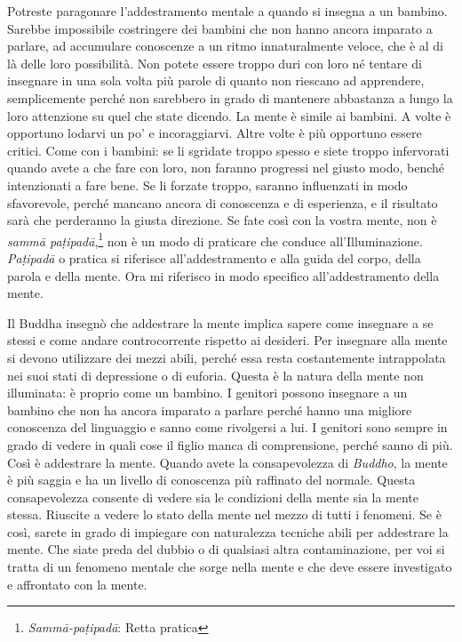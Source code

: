 Potreste paragonare l'addestramento mentale a quando si insegna a un
bambino. Sarebbe impossibile costringere dei bambini che non hanno
ancora imparato a parlare, ad accumulare conoscenze a un ritmo
innaturalmente veloce, che è al di là delle loro possibilità. Non potete
essere troppo duri con loro né tentare di insegnare in una sola volta
più parole di quanto non riescano ad apprendere, semplicemente perché
non sarebbero in grado di mantenere abbastanza a lungo la loro
attenzione su quel che state dicendo. La mente è simile ai bambini. A
volte è opportuno lodarvi un po' e incoraggiarvi. Altre volte è più
opportuno essere critici. Come con i bambini: se li sgridate troppo
spesso e siete troppo infervorati quando avete a che fare con loro, non
faranno progressi nel giusto modo, benché intenzionati a fare bene. Se
li forzate troppo, saranno influenzati in modo sfavorevole, perché
mancano ancora di conoscenza e di esperienza, e il risultato sarà che
perderanno la giusta direzione. Se fate così con la vostra mente, non è
\emph{sammā paṭipadā},\footnote{\emph{Sammā-paṭipadā}: Retta pratica}
non è un modo di praticare che conduce all'Illuminazione.
\emph{Paṭipadā} o pratica si riferisce all'addestramento e alla guida
del corpo, della parola e della mente. Ora mi riferisco in modo
specifico all'addestramento della mente.

Il Buddha insegnò che addestrare la mente implica sapere come insegnare
a se stessi e come andare controcorrente rispetto ai desideri. Per
insegnare alla mente si devono utilizzare dei mezzi abili, perché essa
resta costantemente intrappolata nei suoi stati di depressione o di
euforia. Questa è la natura della mente non illuminata: è proprio come
un bambino. I genitori possono insegnare a un bambino che non ha ancora
imparato a parlare perché hanno una migliore conoscenza del linguaggio e
sanno come rivolgersi a lui. I genitori sono sempre in grado di vedere
in quali cose il figlio manca di comprensione, perché sanno di più. Così
è addestrare la mente. Quando avete la consapevolezza di \emph{Buddho},
la mente è più saggia e ha un livello di conoscenza più raffinato del
normale. Questa consapevolezza consente di vedere sia le condizioni
della mente sia la mente stessa. Riuscite a vedere lo stato della mente
nel mezzo di tutti i fenomeni. Se è così, sarete in grado di impiegare
con naturalezza tecniche abili per addestrare la mente. Che siate preda
del dubbio o di qualsiasi altra contaminazione, per voi si tratta di un
fenomeno mentale che sorge nella mente e che deve essere investigato e
affrontato con la mente.

